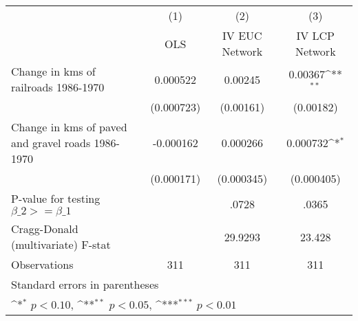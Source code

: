 {
\def\sym#1{\ifmmode^{#1}\else\(^{#1}\)\fi}
\begin{tabular}{l*{3}{c}}
\hline\hline
                &\multicolumn{1}{c}{(1)}&\multicolumn{1}{c}{(2)}&\multicolumn{1}{c}{(3)}\\
                &\multicolumn{1}{c}{OLS}&\multicolumn{1}{c}{IV EUC Network}&\multicolumn{1}{c}{IV LCP Network}\\
\hline
Change in kms of railroads 1986-1970& 0.000522         &  0.00245         &  0.00367\sym{**} \\
                &(0.000723)         &(0.00161)         &(0.00182)         \\
[1em]
Change in kms of paved and gravel roads 1986-1970&-0.000162         & 0.000266         & 0.000732\sym{*}  \\
                &(0.000171)         &(0.000345)         &(0.000405)         \\
\hline
P-value for testing $\beta\_{2} >= \beta\_{1}$&                  &    .0728         &    .0365         \\
Cragg-Donald (multivariate) F-stat&                  &  29.9293         &   23.428         \\
Observations    &      311         &      311         &      311         \\
\hline\hline
\multicolumn{4}{l}{\footnotesize Standard errors in parentheses}\\
\multicolumn{4}{l}{\footnotesize \sym{*} \(p<0.10\), \sym{**} \(p<0.05\), \sym{***} \(p<0.01\)}\\
\end{tabular}
}
